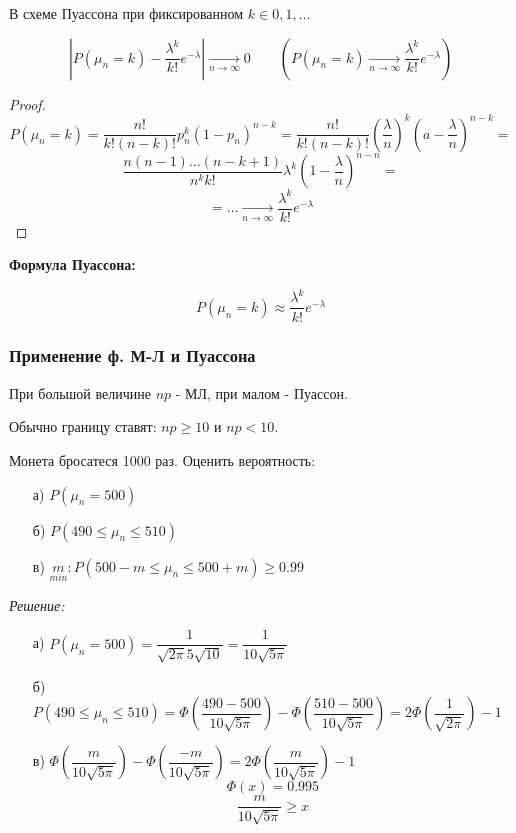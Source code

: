 \begin{definition}
	В схеме Пуассона при фиксированном $k \in 0,1, \dots$
	
	\[ \left| P(\mu_n = k) - \dfrac{\lambda^k}{k!}e^{-\lambda} \right| \underset{n \to \infty}{\to} 0 ~~~~~~~~~ \left( P(\mu_n = k)\underset{n \to \infty}{\to} \dfrac{\lambda^k}{k!}e^{- \lambda} \right) \]
	
	\begin{proof}
		\[ P(\mu_n = k) = \dfrac{n!}{k!(n-k)!} p_n^k (1-p_n)^{n-k} = \dfrac{n!}{k!(n-k)!} \left( \dfrac{\lambda}{n} \right)^k \left( a - \dfrac{\lambda}{n} \right)^{n-k} = \]
		\[ \dfrac{n(n-1) \dots (n-k+1)}{n^k k!} \lambda^k \left( 1-\dfrac{\lambda}{n} \right)^{n-n} = \]
		\[ = \dots \underset{n \to \infty}{\to} \dfrac{\lambda^k}{k!}e^{-\lambda} \]
	\end{proof}

\end{definition}

\noindent\textbf{Формула Пуассона:}

\[ P(\mu_n = k) \approx \dfrac{\lambda^k}{k!}e^{-\lambda} \]

\subsubsection{Применение ф. М-Л и Пуассона}

При большой величине $np$ - МЛ, при малом - Пуассон.

Обычно границу ставят: $np \ge 10$ и $np < 10$.

\begin{exmp}
	Монета бросатеся 1000 раз. Оценить вероятность:
	\begin{enumerate}
		\item[а)] $P(\mu_n = 500)$
		\item[б)] $P(490 \le \mu_n \le 510)$
		\item[в)] $\underset{min}{m} : P(500-m \le \mu_n \le 500+m) \ge 0.99$
	\end{enumerate}

	\textit{Решение:}
	
	\begin{enumerate}
		\item[а)] $P(\mu_n = 500) = \dfrac{1}{\sqrt{2 \pi} 5 \sqrt{10}} = \dfrac{1}{10\sqrt{5 \pi}}$
		\item[б)] $P(490 \le \mu_n \le 510) = \Phi \left( \dfrac{490-500}{10\sqrt{5 \pi}} \right) - \Phi \left( \dfrac{510-500}{10\sqrt{5 \pi}} \right) = 2 \Phi \left( \dfrac{1}{\sqrt{2 \pi}} \right) - 1$
		\item[в)] $\Phi \left( \dfrac{m}{10 \sqrt{5 \pi}} \right) - \Phi \left( \dfrac{-m}{10 \sqrt{5 \pi}} \right) = 2\Phi \left( \dfrac{m}{10 \sqrt{5 \pi}} \right) - 1$
		\[ \Phi(x) = 0.995 \]
		\[ \dfrac{m}{10 \sqrt{5 \pi}} \ge x \]
	\end{enumerate}
\end{exmp}

